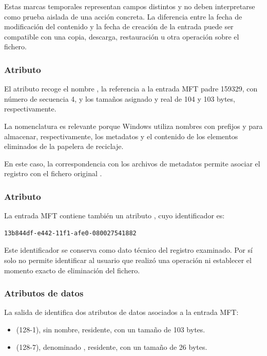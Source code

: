 Estas marcas temporales representan campos distintos y no deben
interpretarse como prueba aislada de una acción concreta.
La diferencia entre la fecha de modificación del contenido
y la fecha de creación de la entrada puede ser compatible
con una copia, descarga, restauración u otra operación
sobre el fichero.

\subsubsection{Atributo }

El atributo  recoge el nombre
, la referencia a la entrada MFT padre
159329, con número de secuencia 4, y los tamaños asignado
y real de 104 y 103 bytes, respectivamente.

La nomenclatura  es relevante porque Windows utiliza
nombres con prefijos  y  para almacenar,
respectivamente, los metadatos y el contenido de los elementos
eliminados de la papelera de reciclaje.

En este caso, la correspondencia con los archivos de metadatos
 permite asociar el registro con el fichero original
.

\subsubsection{Atributo }

La entrada MFT contiene también un atributo
, cuyo identificador es:

\begin{lstlisting}[style=terminal,breaklines=true]
	13b844df-e442-11f1-afe0-080027541882
\end{lstlisting}

Este identificador se conserva como dato técnico del registro
examinado. Por sí solo no permite identificar al usuario que
realizó una operación ni establecer el momento exacto
de eliminación del fichero.

\subsubsection{Atributos de datos}

La salida de  identifica dos atributos de datos
asociados a la entrada MFT:

\begin{itemize}
	\item {} (128-1), sin nombre, residente,
	con un tamaño de 103 bytes.
	\item {} (128-7), denominado
	, residente,
	con un tamaño de 26 bytes.
\end{itemize}


